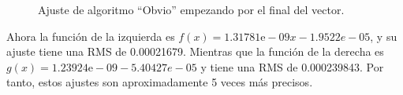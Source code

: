 \documentclass[a4]{article}
\begin{document}
\begin{figure}[H]
  \centering
  \caption{Ajuste de algoritmo ``Obvio'' empezando por el final del
    vector.}
  \label{fig:ajust-sol-obvio-inverso}
\end{figure}

Ahora la función de la izquierda es
$f(x)=1.31781\mbox{e}-09x-1.9522e-05$, y su ajuste tiene una RMS de
0.00021679. Mientras que la función de la derecha es
$g(x)=1.23924\mbox{e}-09-5.40427e-05$ y tiene una RMS de
0.000239843. Por tanto, estos ajustes son aproximadamente 5 veces más
precisos.
\end{document}

